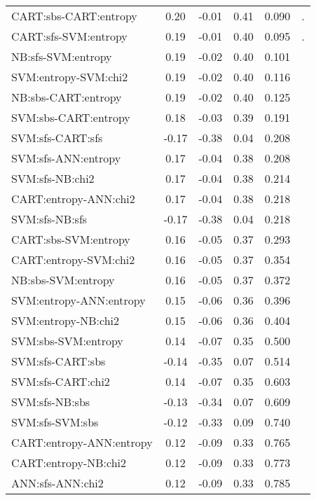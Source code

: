 \begin{center}
\begin{longtable}{|l|c|c|c|c|l}
    CART:sbs-CART:entropy &   0.20 &  -0.01 &   0.41 &  0.090 &    . \\
     CART:sfs-SVM:entropy &   0.19 &  -0.01 &   0.40 &  0.095 &    . \\
       NB:sfs-SVM:entropy &   0.19 &  -0.02 &   0.40 &  0.101 &      \\
     SVM:entropy-SVM:chi2 &   0.19 &  -0.02 &   0.40 &  0.116 &      \\
      NB:sbs-CART:entropy &   0.19 &  -0.02 &   0.40 &  0.125 &      \\
     SVM:sbs-CART:entropy &   0.18 &  -0.03 &   0.39 &  0.191 &      \\
         SVM:sfs-CART:sfs &  -0.17 &  -0.38 &   0.04 &  0.208 &      \\
      SVM:sfs-ANN:entropy &   0.17 &  -0.04 &   0.38 &  0.208 &      \\
          SVM:sfs-NB:chi2 &   0.17 &  -0.04 &   0.38 &  0.214 &      \\
    CART:entropy-ANN:chi2 &   0.17 &  -0.04 &   0.38 &  0.218 &      \\
           SVM:sfs-NB:sfs &  -0.17 &  -0.38 &   0.04 &  0.218 &      \\
     CART:sbs-SVM:entropy &   0.16 &  -0.05 &   0.37 &  0.293 &      \\
    CART:entropy-SVM:chi2 &   0.16 &  -0.05 &   0.37 &  0.354 &      \\
       NB:sbs-SVM:entropy &   0.16 &  -0.05 &   0.37 &  0.372 &      \\
  SVM:entropy-ANN:entropy &   0.15 &  -0.06 &   0.36 &  0.396 &      \\
      SVM:entropy-NB:chi2 &   0.15 &  -0.06 &   0.36 &  0.404 &      \\
      SVM:sbs-SVM:entropy &   0.14 &  -0.07 &   0.35 &  0.500 &      \\
         SVM:sfs-CART:sbs &  -0.14 &  -0.35 &   0.07 &  0.514 &      \\
        SVM:sfs-CART:chi2 &   0.14 &  -0.07 &   0.35 &  0.603 &      \\
           SVM:sfs-NB:sbs &  -0.13 &  -0.34 &   0.07 &  0.609 &      \\
          SVM:sfs-SVM:sbs &  -0.12 &  -0.33 &   0.09 &  0.740 &      \\
 CART:entropy-ANN:entropy &   0.12 &  -0.09 &   0.33 &  0.765 &      \\
     CART:entropy-NB:chi2 &   0.12 &  -0.09 &   0.33 &  0.773 &      \\
         ANN:sfs-ANN:chi2 &   0.12 &  -0.09 &   0.33 &  0.785 &      \\

\end{longtable}
\end{center}
